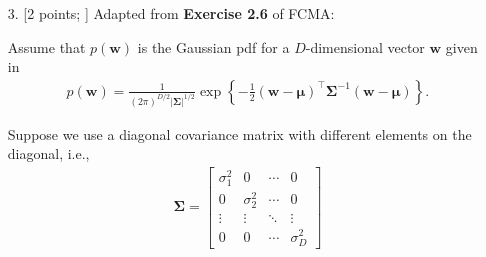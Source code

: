 \documentclass[10pt]{article}
\begin{document}
\begin{itemize}
{\bf Solution.}

\begin{eqnarray}
\begin{aligned}
p(x) &= \mathcal{U}(a,b) = \frac{1}{b-a} = \frac{1}{10 - (-4)} = \frac{1}{14}
\\
\mathbf{E}_{p(x)} \left\{ 35 + 3x - 0.5x^3 + 0.05x^4 \right\} 
&= \int_{x=-4}^{10} 35 + 3x - 0.5x^3 + 0.05x^4 p(x) dx
\\
&= \int_{x=-4}^{10} \frac{35 + 3x - 0.5x^3 + 0.05x^4}{14} dx
\\
&= \left[ \frac{35x + \frac{3}{2}x^2 - \frac{0.5}{4}x^4 + \frac{0.05}{5}x^5}{14} \right]_{-4}^{10}
\\
&= \frac{((35 * 10) + (1.5 * 100) - (0.125 * 10000) + (0.01 * 100000))}{14}
\\
& - \frac{((35 * -4) + (1.5 * 16)  - (0.125 * 256 ) + (0.01 * 1024) )}{14}
\\
&= \frac{(350 + 150 - 1250 + 1000)}{14} - \frac{(-140 + 24 - 32 + 10.24)}{14}
\\
&= \frac{250 + 137.76}{14}
\\
&= \frac{387.76}{14}
\\
&= 27.70
\end{aligned}
\end{eqnarray}

\item[3.] [2 points; \boldred{Required only for Graduates}]
Adapted from {\bf Exercise 2.6} of FCMA:

Assume that $p(\mathbf{w})$ is the Gaussian pdf for a $D$-dimensional vector $\mathbf{w}$ given in
\begin{eqnarray}
p(\mathbf{w}) = \frac{1}{(2 \pi)^{D/2} | \mathbf{\Sigma} |^{1/2}} \exp \left\{ -\frac{1}{2} (\mathbf{w} - \boldsymbol{\mu})^\top \mathbf{\Sigma}^{-1} (\mathbf{w} - \boldsymbol{\mu}) \right\} . \label{eqn:multnormal}
\end{eqnarray}

Suppose we use a diagonal covariance matrix with different elements on the diagonal, i.e.,
\begin{eqnarray*}
\mathbf{\Sigma} = 
\begin{bmatrix}
\sigma_1^2 & 0 & \cdots & 0 \\
0 & \sigma_2^2 & \cdots & 0 \\
\vdots & \vdots & \ddots & \vdots \\
0 & 0 & \cdots & \sigma_D^2
\end{bmatrix}
\end{eqnarray*}


\end{itemize}
\end{document}
